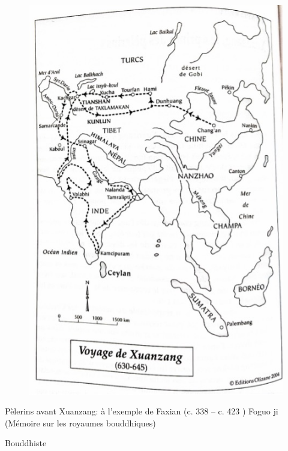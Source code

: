 \begin{figure}[!h]
    \centering
        \includegraphics[width=.5\textwidth]{ConfucianismeTaoismeBouddhismeChinois/XuanzangVoyage2.jpg}

    \label{fig:enter-label}
\end{figure}
Pèlerins avant Xuanzang: à l’exemple de Faxian    (c. 338 -- c. 423 )	Foguo ji (Mémoire sur les royaumes bouddhiques)

\begin{Def}[Fo]
    Bouddhiste
\end{Def}
